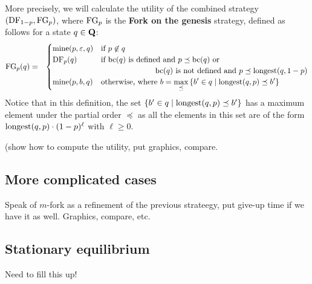 More precisely, we will calculate the utility of the combined strategy $(\text{\rm DF}_{1-p},\text{\rm FG}_p)$, where $\text{\rm FG}_p$ is the \textbf{Fork on the genesis} 
strategy, defined as follows for a state $q \in \mathbf{Q}$:
\begin{eqnarray*}
\text{\rm FG}_p(q) & = &
\begin{cases}
\text{\rm mine}(p,\varepsilon,q) & \text{if } p \not\in q\\
\text{\rm DF}_p(q) & \text{if } \text{bc}(q) \text{ is defined and } p \preceq \text{bc}(q) \text{ or}\\
& \hspace{70pt} \text{bc}(q) \text{ is not defined and } p \preceq {\text{\rm longest}}(q,1-p)\\
\text{\rm mine}(p,b,q) &  \text{otherwise, where } {\displaystyle b = \max_{\preceq} \, \{ b' \in q \mid {\text{\rm longest}}(q,p) \preceq b'\}}
\end{cases}
\end{eqnarray*}
Notice that in this definition, the set $\{ b' \in q \mid {\text{\rm longest}}(q,p) \preceq b'\}$ has a maximum element under the partial order $\preceq$ as all the elements in this set are of the form ${\text{\rm longest}}(q,p) \cdot (1-p)^\ell$ with $\ell \geq 0$.

(show how to compute the utility, put graphics, compare. 

\subsection{More complicated cases}

Speak of $m$-fork as a refinement of the previous strateegy, put give-up time if we have it as well. Graphics, compare, etc. 

\subsection{Stationary equilibrium}

Need to fill this up! 
